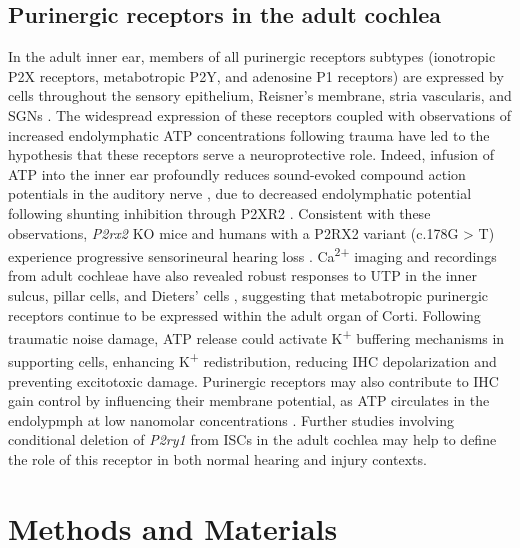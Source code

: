 \documentclass[9pt,lineno]{elife}
\begin{document}
\subsection{Purinergic receptors in the adult cochlea}
In the adult inner ear, members of all purinergic receptors subtypes (ionotropic P2X receptors, metabotropic P2Y, and adenosine P1 receptors) are expressed by cells throughout the sensory epithelium, Reisner’s membrane, stria vascularis, and SGNs \citep{Housley2009a,Huang2010}. The widespread expression of these receptors coupled with observations of increased endolymphatic ATP concentrations following trauma \citep{Munoz1995} have led to the hypothesis that these receptors serve a neuroprotective role. Indeed, infusion of ATP into the inner ear profoundly reduces sound-evoked compound action potentials in the auditory nerve \citep{Bobbin1978a,Munoz1995b}, due to decreased endolymphatic potential following shunting inhibition through P2XR2 \citep{Housley2013b}. Consistent with these observations, \textit{P2rx2} KO mice and humans with a P2RX2 variant (c.178G > T) experience progressive sensorineural hearing loss \citep{Yan2013a}. Ca\textsuperscript{2+} imaging and recordings from adult cochleae have also revealed robust responses to UTP in the inner sulcus, pillar cells, and Dieters' cells \citep{Sirko2019,Zhu2010a}, suggesting that metabotropic purinergic receptors continue to be expressed within the adult organ of Corti. Following traumatic noise damage, ATP release could activate K\textsuperscript{+} buffering mechanisms in supporting cells, enhancing K\textsuperscript{+} redistribution, reducing IHC depolarization and preventing excitotoxic damage. Purinergic receptors may also contribute to IHC gain control by influencing their membrane potential, as ATP circulates in the endolypmph at low nanomolar concentrations \citep{Munoz1995}. Further studies involving conditional deletion of \textit{P2ry1} from ISCs in the adult cochlea may help to define the role of this receptor in both normal hearing and injury contexts.


\section{Methods and Materials}
\end{document}
